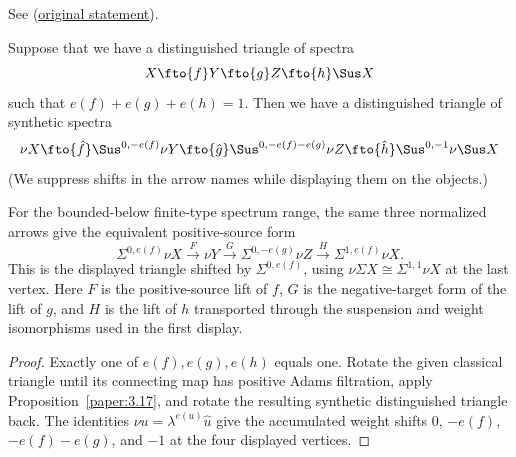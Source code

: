 \begin{proposition}
\label{paper:3.20}
See \cite[Proposition 3.20]{LWX126}
(\href{paper/main.tex.html#L965}{original statement}).\par

Suppose that we have a distinguished triangle of spectra
    $$X\fto{f} Y\fto{g} Z\fto{h} \Sus X$$
    such that $e(f)+e(g)+e(h)=1$. Then we have a distinguished triangle of synthetic spectra
    $$\nu X\fto{\hat f} \Sus^{0,-e(f)}\nu Y\fto{\hat g} \Sus^{0,-e(f)-e(g)}\nu Z\fto{\hat h} \Sus^{0,-1}\nu \Sus X$$
    (We suppress shifts in the arrow names while displaying them on the objects.)



For the bounded-below finite-type spectrum range, the same three
normalized arrows give the equivalent positive-source form
\[
\Sigma^{0,e(f)}\nu X\xrightarrow{F}\nu Y
\xrightarrow{G}\Sigma^{0,-e(g)}\nu Z
\xrightarrow{H}\Sigma^{1,e(f)}\nu X.
\]
This is the displayed triangle shifted by $\Sigma^{0,e(f)}$, using
$\nu\Sigma X\cong\Sigma^{1,1}\nu X$ at the last vertex.
Here $F$ is the positive-source lift of $f$, $G$ is the
negative-target form of the lift of $g$, and $H$ is the
lift of $h$ transported through the suspension and weight
isomorphisms used in the first display.



\end{proposition}
\begin{proof}
Exactly one of $e(f),e(g),e(h)$ equals one. Rotate the given classical triangle until its connecting map has positive Adams filtration, apply Proposition~\ref{paper:3.17}, and rotate the resulting synthetic distinguished triangle back. The identities $\nu u=\lambda^{e(u)}\widehat u$ give the accumulated weight shifts $0$, $-e(f)$, $-e(f)-e(g)$, and $-1$ at the four displayed vertices.

\end{proof}

